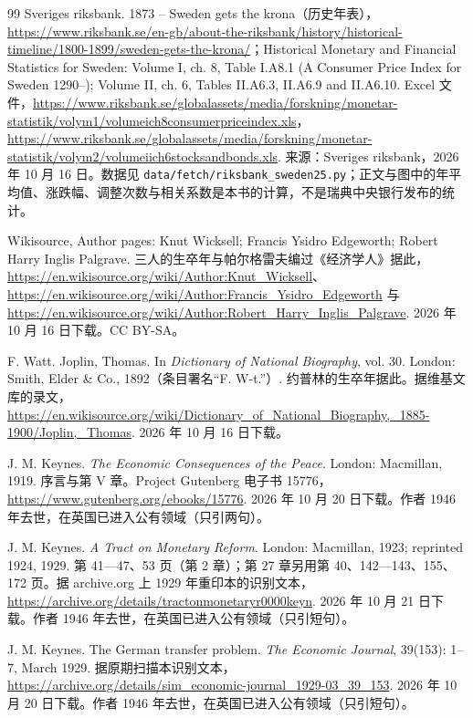 \begin{thebibliography}{99}
 Sveriges riksbank. 1873 -- Sweden gets the krona（历史年表），\url{https://www.riksbank.se/en-gb/about-the-riksbank/history/historical-timeline/1800-1899/sweden-gets-the-krona/}；Historical Monetary and Financial Statistics for Sweden: Volume I, ch. 8, Table I.A8.1 (A Consumer Price Index for Sweden 1290--); Volume II, ch. 6, Tables II.A6.3, II.A6.9 and II.A6.10. Excel 文件，\url{https://www.riksbank.se/globalassets/media/forskning/monetar-statistik/volym1/volumeich8consumerpriceindex.xls}，\url{https://www.riksbank.se/globalassets/media/forskning/monetar-statistik/volym2/volumeiich6stocksandbonds.xls}. 来源：Sveriges riksbank，2026 年 10 月 16 日。数据见 \texttt{data/fetch/riksbank\_sweden25.py}；正文与图中的年平均值、涨跌幅、调整次数与相关系数是本书的计算，不是瑞典中央银行发布的统计。

 Wikisource, Author pages: Knut Wicksell; Francis Ysidro Edgeworth; Robert Harry Inglis Palgrave. 三人的生卒年与帕尔格雷夫编过《经济学人》据此，\url{https://en.wikisource.org/wiki/Author:Knut_Wicksell}、\url{https://en.wikisource.org/wiki/Author:Francis_Ysidro_Edgeworth} 与 \url{https://en.wikisource.org/wiki/Author:Robert_Harry_Inglis_Palgrave}. 2026 年 10 月 16 日下载。CC BY-SA。

 F. Watt. Joplin, Thomas. In \emph{Dictionary of National Biography}, vol. 30. London: Smith, Elder \& Co., 1892（条目署名“F. W-t.”）. 约普林的生卒年据此。据维基文库的录文，\url{https://en.wikisource.org/wiki/Dictionary_of_National_Biography,_1885-1900/Joplin,_Thomas}. 2026 年 10 月 16 日下载。

 J. M. Keynes. \emph{The Economic Consequences of the Peace}. London: Macmillan, 1919. 序言与第 V 章。Project Gutenberg 电子书 15776，\url{https://www.gutenberg.org/ebooks/15776}. 2026 年 10 月 20 日下载。作者 1946 年去世，在英国已进入公有领域（只引两句）。

 J. M. Keynes. \emph{A Tract on Monetary Reform}. London: Macmillan, 1923; reprinted 1924, 1929. 第 41—47、53 页（第 2 章）；第 27 章另用第 40、142—143、155、172 页。据 archive.org 上 1929 年重印本的识别文本，\url{https://archive.org/details/tractonmonetaryr0000keyn}. 2026 年 10 月 21 日下载。作者 1946 年去世，在英国已进入公有领域（只引短句）。

 J. M. Keynes. The German transfer problem. \emph{The Economic Journal}, 39(153): 1--7, March 1929. 据原期扫描本识别文本，\url{https://archive.org/details/sim_economic-journal_1929-03_39_153}. 2026 年 10 月 20 日下载。作者 1946 年去世，在英国已进入公有领域（只引短句）。


\end{thebibliography}
